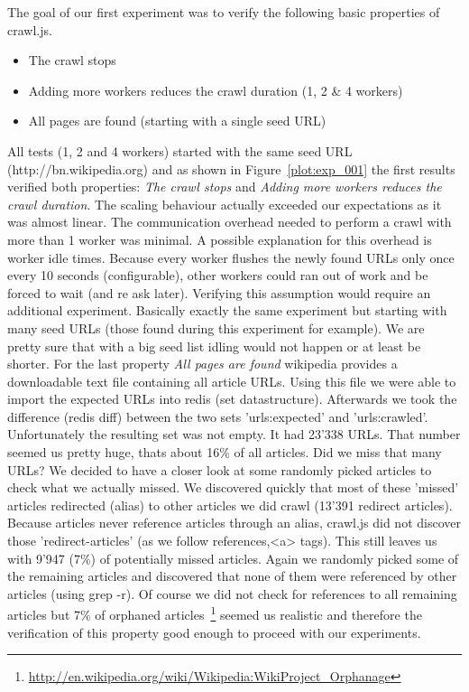 The goal of our first experiment was to verify the following basic properties of crawl.js.

\begin{itemize}
\item The crawl stops
\item Adding more workers reduces the crawl duration (1, 2 \& 4 workers)
\item All pages are found (starting with a single seed URL)
\end{itemize}

 All tests (1, 2 and 4 workers) started with the same seed URL (http://bn.wikipedia.org) and as shown in Figure~\ref{plot:exp_001} the first results verified both properties: \emph{The crawl stops} and \emph{Adding more workers reduces the crawl duration}. The scaling behaviour actually exceeded our expectations as it was almost linear. The communication overhead needed to perform a crawl with more than 1 worker was minimal. A possible explanation for this overhead is worker idle times. Because every worker flushes the newly found URLs only once every 10 seconds (configurable), other workers could ran out of work and be forced to wait (and re ask later). Verifying this assumption would require an additional experiment. Basically exactly the same experiment but starting with many seed URLs (those found during this experiment for example). We are pretty sure that with a big seed list idling would not happen or at least be shorter.
\newline
\newline
For the last property \emph{All pages are found} wikipedia provides a downloadable text file containing all article URLs. Using this file we were able to import the expected URLs into redis (set datastructure). Afterwards we took the difference (redis diff) between the two sets 'urls:expected' and 'urls:crawled'. Unfortunately the resulting set was not empty. It had 23'338 URLs. That number seemed us pretty huge, thats about 16\% of all articles. Did we miss that many URLs? We decided to have a closer look at some randomly picked articles to check what we actually missed. We discovered quickly that most of these 'missed' articles redirected (alias) to other articles we did crawl (13'391 redirect articles). Because articles never reference articles through an alias, crawl.js did not discover those 'redirect-articles' (as we follow references,<a> tags). This still leaves us with 9'947 (7\%) of potentially missed articles. Again we randomly picked some of the remaining articles and discovered that none of them were referenced by other articles (using grep -r). Of course we did not check for references to all remaining articles but 7\% of orphaned articles~\footnote{\url{http://en.wikipedia.org/wiki/Wikipedia:WikiProject_Orphanage}} seemed us realistic and therefore the verification of this property good enough to proceed with our experiments.
